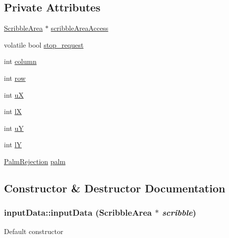 \subsection*{Private Attributes}
\begin{DoxyCompactItemize}
\item 
\hyperlink{classScribbleArea}{ScribbleArea} $\ast$ \hyperlink{classinputData_a2a1bd4615bbf788f18e9352cc1b15b8b}{scribbleAreaAccess}
\item 
volatile bool \hyperlink{classinputData_aa241df26fe2f43448724bb801af61a07}{stop\_\-request}
\item 
int \hyperlink{classinputData_a54f2c2bcec32f5cc12264d878749e346}{column}
\item 
int \hyperlink{classinputData_a037542f6902942f602c2c39a96933646}{row}
\item 
int \hyperlink{classinputData_a2e8223509680d8fffb007c2c5abe880d}{uX}
\item 
int \hyperlink{classinputData_ae1262f428775758c7a5134424ccbc9c7}{lX}
\item 
int \hyperlink{classinputData_af4ee5ed0f3f38f39d96d3627373c6040}{uY}
\item 
int \hyperlink{classinputData_ada93733b51163d0692ade2b89eb398ef}{lY}
\item 
\hyperlink{classPalmRejection}{PalmRejection} \hyperlink{classinputData_a9d8b8077f8da1733a98fa0cbf7f782a7}{palm}
\end{DoxyCompactItemize}


\subsection{Constructor \& Destructor Documentation}
\hypertarget{classinputData_a51ae7522e18bc9301e5f0c858cc8937f}{
\subsubsection[{inputData}]{\setlength{\rightskip}{0pt plus 5cm}inputData::inputData ({\bf ScribbleArea} $\ast$ {\em scribble})}}
\label{classinputData_a51ae7522e18bc9301e5f0c858cc8937f}
Default constructor



